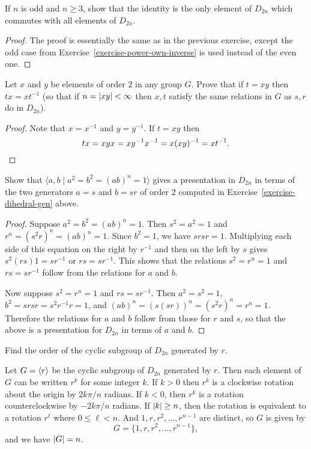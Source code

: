  If $n$ is odd and $n\geq3$, show that the identity is the
only element of $D_{2n}$ which commutes with all elements of $D_{2n}$.
\begin{proof}
  The proof is essentially the same as in the previous exercise,
  except the odd case from Exercise~\ref{exercise-power-own-inverse}
  is used instead of the even one.
\end{proof}

 Let $x$ and $y$ be elements of order $2$ in any group
$G$. Prove that if $t = xy$ then $tx = xt^{-1}$ (so that if
$n = \lvert{xy}\rvert < \infty$ then $x, t$ satisfy the same relations in $G$
as $s,r$ do in $D_{2n}$).
\begin{proof}
  Note that $x = x^{-1}$ and $y = y^{-1}$. If $t = xy$ then
  \begin{equation*}
    tx = xyx = xy^{-1}x^{-1} = x(xy)^{-1} = xt^{-1}. \qedhere
  \end{equation*}
\end{proof}

 Show that $\langle a,b\mid a^2 = b^2 = (ab)^n = 1\rangle$
gives a presentation in $D_{2n}$ in terms of the two generators
$a = s$ and $b = sr$ of order $2$ computed in
Exercise~\ref{exercise-dihedral-gen} above.
\begin{proof}
  Suppose $a^2 = b^2 = (ab)^n = 1$. Then $s^2 = a^2 = 1$ and
  $r^n = (s^2r)^n = (ab)^n = 1$. Since $b^2 = 1$, we have $srsr =
  1$. Multiplying each side of this equation on the right by $r^{-1}$
  and then on the left by $s$ gives $s^2(rs)1 = sr^{-1}$ or
  $rs = sr^{-1}$. This shows that the relations $s^2 = r^n = 1$ and
  $rs = sr^{-1}$ follow from the relations for $a$ and $b$.

  Now suppose $s^2 = r^n = 1$ and $rs = sr^{-1}$. Then
  $a^2 = s^2 = 1$, $b^2 = srsr = s^2r^{-1}r = 1$, and
  $(ab)^n = (s(sr))^n = (s^2r)^n = r^n = 1$. Therefore the relations
  for $a$ and $b$ follow from those for $r$ and $s$, so that the above
  is a presentation for $D_{2n}$ in terms of $a$ and $b$.
\end{proof}

 Find the order of the cyclic subgroup of $D_{2n}$ generated
by $r$.
\begin{solution}
  Let $G = \langle{r}\rangle$ be the cyclic subgroup of $D_{2n}$ generated by
  $r$. Then each element of $G$ can be written $r^k$ for some integer
  $k$. If $k>0$ then $r^k$ is a clockwise rotation about the origin by
  $2k\pi/n$ radians. If $k<0$, then $r^k$ is a rotation
  counterclockwise by $-2k\pi/n$ radians. If $\lvert{k}\rvert\geq n$, then the
  rotation is equivalent to a rotation $r^\ell$ where
  $0\leq\ell<n$. And $1, r, r^2, \dots, r^{n-1}$ are distinct, so $G$
  is given by
  \begin{equation*}
    G = \{ 1, r, r^2, \dots, r^{n-1} \},
  \end{equation*}
  and we have $\lvert{G}\rvert = n$.
\end{solution}

